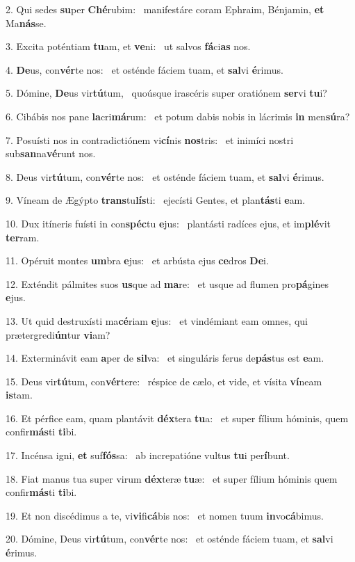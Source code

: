 2. Qui sedes \textbf{su}per \textbf{Ché}rubim: \ast\  manifestáre coram Ephraim, Bénjamin, \textbf{et} Ma\textbf{nás}se.\

3. Excita poténtiam \textbf{tu}am, et \textbf{ve}ni: \ast\  ut salvos \textbf{fá}ci\textbf{as} nos.\

4. \textbf{De}us, con\textbf{vér}te nos: \ast\  et osténde fáciem tuam, et \textbf{sal}vi \textbf{é}rimus.\

5. Dómine, \textbf{De}us vir\textbf{tú}tum, \ast\  quoúsque irascéris super oratiónem \textbf{ser}vi \textbf{tu}i?\

6. Cibábis nos pane \textbf{la}cri\textbf{má}rum: \ast\  et potum dabis nobis in lácrimis \textbf{in} men\textbf{sú}ra?\

7. Posuísti nos in contradictiónem vi\textbf{cí}nis \textbf{nos}tris: \ast\  et inimíci nostri sub\textbf{san}na\textbf{vé}runt nos.\

8. Deus vir\textbf{tú}tum, con\textbf{vér}te nos: \ast\  et osténde fáciem tuam, et \textbf{sal}vi \textbf{é}rimus.\

9. Víneam de Ægýpto \textbf{trans}tu\textbf{lís}ti: \ast\  ejecísti Gentes, et plan\textbf{tás}ti \textbf{e}am.\

10. Dux itíneris fuísti in con\textbf{spéc}tu \textbf{e}jus: \ast\  plantásti radíces ejus, et im\textbf{plé}vit \textbf{ter}ram.\

11. Opéruit montes \textbf{um}bra \textbf{e}jus: \ast\  et arbústa ejus \textbf{ce}dros \textbf{De}i.\

12. Exténdit pálmites suos \textbf{us}que ad \textbf{ma}re: \ast\  et usque ad flumen pro\textbf{pá}gines \textbf{e}jus.\

13. Ut quid destruxísti ma\textbf{cé}riam \textbf{e}jus: \ast\  et vindémiant eam omnes, qui prætergredi\textbf{ún}tur \textbf{vi}am?\

14. Exterminávit eam \textbf{a}per de \textbf{sil}va: \ast\  et singuláris ferus de\textbf{pás}tus est \textbf{e}am.\

15. Deus vir\textbf{tú}tum, con\textbf{vér}tere: \ast\  réspice de cælo, et vide, et vísita \textbf{ví}neam \textbf{is}tam.\

16. Et pérfice eam, quam plantávit \textbf{déx}tera \textbf{tu}a: \ast\  et super fílium hóminis, quem confir\textbf{más}ti \textbf{ti}bi.\

17. Incénsa igni, \textbf{et} suf\textbf{fós}sa: \ast\  ab increpatióne vultus \textbf{tu}i per\textbf{í}bunt.\

18. Fiat manus tua super virum \textbf{déx}teræ \textbf{tu}æ: \ast\  et super fílium hóminis quem confir\textbf{más}ti \textbf{ti}bi.\

19. Et non discédimus a te, vi\textbf{vi}fi\textbf{cá}bis nos: \ast\  et nomen tuum \textbf{in}vo\textbf{cá}bimus.\

20. Dómine, Deus vir\textbf{tú}tum, con\textbf{vér}te nos: \ast\  et osténde fáciem tuam, et \textbf{sal}vi \textbf{é}rimus.\


